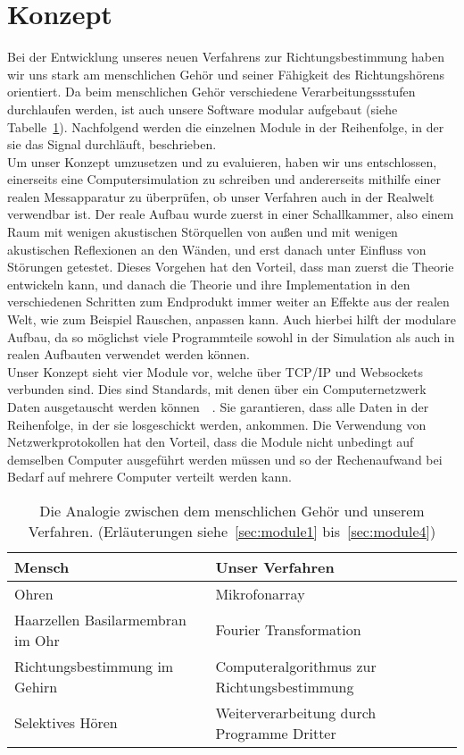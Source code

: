 \section{Konzept}
Bei der Entwicklung unseres neuen Verfahrens zur Richtungsbestimmung haben wir uns stark am menschlichen Gehör und seiner Fähigkeit des Richtungshörens orientiert. Da beim menschlichen Gehör verschiedene Verarbeitungssstufen durchlaufen werden, ist auch unsere Software modular aufgebaut (siehe Tabelle~\ref{analog}). Nachfolgend werden die einzelnen Module in der Reihenfolge, in der sie das Signal durchläuft, beschrieben.\\
Um unser Konzept umzusetzen und zu evaluieren, haben wir uns entschlossen, einerseits eine Computersimulation zu schreiben und andererseits mithilfe einer realen Messapparatur zu überprüfen, ob unser Verfahren auch in der Realwelt verwendbar ist. Der reale Aufbau wurde zuerst in einer Schallkammer, also einem Raum mit wenigen akustischen Störquellen von außen und mit wenigen akustischen Reflexionen an den Wänden, und erst danach unter Einfluss von Störungen getestet. Dieses Vorgehen hat den Vorteil, dass man zuerst die Theorie entwickeln kann, und danach die Theorie und ihre Implementation in den verschiedenen Schritten zum Endprodukt immer weiter an Effekte aus der realen Welt, wie zum Beispiel Rauschen, anpassen kann. Auch hierbei hilft der modulare Aufbau, da so möglichst viele Programmteile sowohl in der Simulation als auch in realen Aufbauten verwendet werden können.\\
Unser Konzept sieht vier Module vor, welche über TCP/IP und Websockets verbunden sind. Dies sind Standards, mit denen über ein Computernetzwerk Daten ausgetauscht werden können~\cite{tcp}~\cite{websockets}. Sie garantieren, dass alle Daten in der Reihenfolge, in der sie losgeschickt werden, ankommen. Die Verwendung von Netzwerkprotokollen hat den Vorteil, dass die Module nicht unbedingt auf demselben Computer ausgeführt werden müssen und so der Rechenaufwand bei Bedarf auf mehrere Computer verteilt werden kann.
\begin{table}[h]
	\centering
	\begin{tabular}{ll}
      Mensch            & Unser Verfahren                                   \\ \midrule
      Ohren             & Mikrofonarray                              \\
      Haarzellen Basilarmembran im Ohr & Fourier Transformation                     \\
      Richtungsbestimmung im Gehirn            & Computeralgorithmus zur Richtungsbestimmung                       \\
      Selektives Hören  & Weiterverarbeitung durch Programme Dritter
	\end{tabular}
    \caption{Die Analogie zwischen dem menschlichen Gehör und unserem Verfahren. (Erläuterungen siehe~\ref{sec:module1} bis~\ref{sec:module4})\label{analog}}
\end{table}

